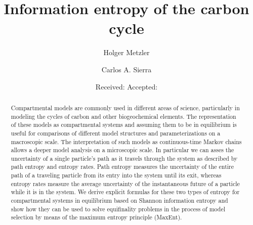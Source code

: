 \documentclass[smallextended]{svjour3}
\newcommand{\red}[1]{\textcolor{red}{#1}}
\begin{document}
\title{Information entropy of the carbon cycle %
}


\author{Holger Metzler \and Carlos A. Sierra}



\date{Received: \hspace{2cm} Accepted: \hspace{2cm}}

\maketitle

\begin{abstract}
Compartmental models are commonly used in different areas of science, particularly in modeling the cycles of carbon and other biogeochemical elements.
The representation of these models as compartmental systems and assuming them to be in equilibrium is useful for comparisons of different model structures and parameterizations on a macroscopic scale.
The interpretation of such models as continuous-time Markov chains allows a deeper model analysis on a microscopic scale.
In particular we can asses the uncertainty of a single particle's path as it travels through the system as described by path entropy and entropy rates.
Path entropy measures the uncertainty of the entire path of a traveling particle from its entry into the system until its exit, whereas entropy rates measure the average uncertainty of the instantaneous future of a particle while it is in the system.
We derive explicit formulas for these two types of entropy for compartmental systems in equilibrium based on Shannon information entropy and show how they can be used to solve equifinality problems in the process of model selection by means of the maximum entropy principle (MaxEnt).


\subclass{\red{34A30 \and 60J28 \and 60K20 \and 92B05}}
\end{abstract}
\end{document}
